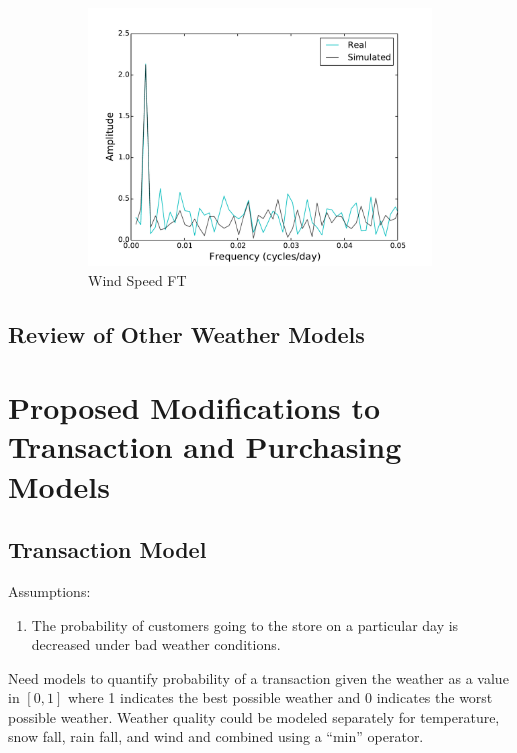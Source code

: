 \documentclass[11pt, letterpaper]{article}
\begin{document}
\begin{figure}[H]
\begin{subfigure}[b]{0.45\textwidth}
    \includegraphics[width=\textwidth]{figures/daily_wind_speed_fft.pdf}
    \caption{Wind Speed FT}
  \end{subfigure}
  
  \label{fig:analysis}
  \caption{}
\end{figure}


\subsection{Review of Other Weather Models}

\newpage
\section{Proposed Modifications to Transaction and Purchasing Models}

\subsection{Transaction Model}

Assumptions:
\begin{enumerate}
\item The probability of customers going to the store on a particular day is decreased under bad weather conditions.
\end{enumerate}

Need models to quantify probability of a transaction given the weather as a value in $[0, 1]$ where 1 indicates the best possible weather and 0 indicates the worst possible weather.  Weather quality could be modeled separately for temperature, snow fall, rain fall, and wind and combined using a ``min'' operator.   
\end{document}
